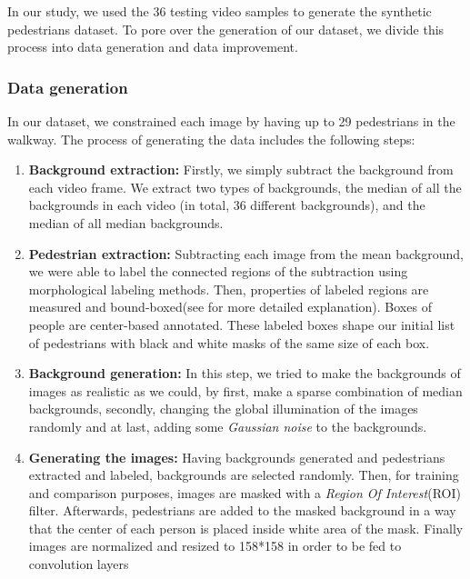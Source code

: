 \indent In our study, we used the 36 testing video samples to generate the synthetic pedestrians dataset. To pore over the generation of our dataset, we divide this process into data generation and data improvement.

  
\subsubsection{Data generation}

In our dataset, we constrained each image by having up to 29 pedestrians in the walkway. The process of generating the data includes the following steps:
\begin{enumerate}

\item \textbf{Background extraction:} Firstly, we simply subtract the background from each video frame. We extract two types of backgrounds, the median of all the backgrounds in each video (in total, 36 different backgrounds), and the median of all median backgrounds.

\item \textbf{Pedestrian extraction:} Subtracting each image from the mean background, we were able to label the connected regions of the subtraction using morphological labeling methods. Then, properties of labeled regions are measured and bound-boxed(see \cite{van2014scikit} for more detailed explanation). Boxes of people are center-based annotated. These labeled boxes shape our initial list of pedestrians with black and white masks of the same size of each box.

\item \textbf{Background generation:} In this step, we tried to make the backgrounds of images as realistic as we could, by first, make a sparse combination of median backgrounds, secondly, changing the global illumination of the images randomly and at last, adding some \textit{Gaussian noise} to the backgrounds. 

\item \textbf{Generating the images:} Having backgrounds generated and pedestrians extracted and labeled, backgrounds are selected randomly. Then, for training and comparison purposes, images are masked with a \textit{Region Of Interest}(ROI) filter. Afterwards, pedestrians are added to the masked background in a way that the center of each person is placed inside white area of the mask. Finally images are normalized and resized to 158*158 in order to be fed to convolution layers

\end{enumerate}

